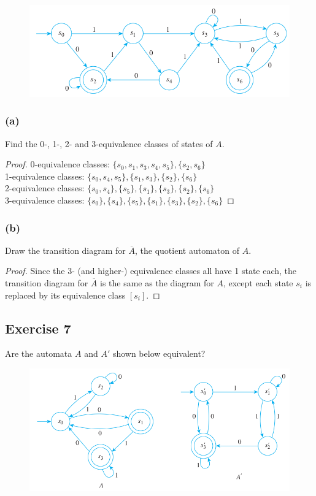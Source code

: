 \documentclass[14pt]{extarticle}
\begin{document}
\begin{figure}[ht!]
\centering
\includegraphics[scale=0.5]{../images/12.3.6.png}
\end{figure}

\subsubsection{(a)}
Find the 0-, 1-, 2- and 3-equivalence classes of states of \(A\).

\begin{proof}
0-equivalence classes: \(\{s_0, s_1, s_3, s_4, s_5\}, \{s_2, s_6\}\) \\
1-equivalence classes: \(\{s_0, s_4, s_5\}, \{s_1, s_3\}, \{s_2\}, \{s_6\}\) \\
2-equivalence classes: \(\{s_0, s_4\}, \{s_5\}, \{s_1\}, \{s_3\}, \{s_2\}, \{s_6\}\) \\
3-equivalence classes: \(\{s_0\}, \{s_4\}, \{s_5\}, \{s_1\}, \{s_3\}, \{s_2\}, \{s_6\}\)
\end{proof}

\subsubsection{(b)}
Draw the transition diagram for \(\overline{A}\), the quotient automaton of \(A\).

\begin{proof}
Since the 3- (and higher-) equivalence classes all have 1 state each, the transition diagram for \(\overline{A}\) is the 
same as the diagram for \(A\), except each state \(s_i\) is replaced by its equivalence class \([s_i]\).
\end{proof}

\subsection{Exercise 7}
Are the automata \(A\) and \(A'\) shown below equivalent?

\begin{figure}[ht!]
\centering
\includegraphics[scale=0.5]{../images/12.3.7.png}
\end{figure}
\end{document}
